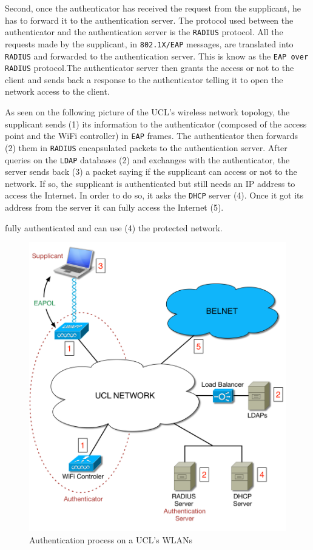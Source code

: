 Second, once the authenticator has received the request from the supplicant, he has to forward it to the authentication server. The protocol used between the authenticator and the authentication server is the \texttt{RADIUS} protocol. All the requests made by the supplicant, in \texttt{802.1X/EAP} messages, are translated into \texttt{RADIUS} and forwarded to the authentication server. This is know as the \texttt{EAP over RADIUS} protocol.The authenticator server then grants the access or not to the client and sends back a response to the authenticator telling it to open the network access to the client.

As seen on the following picture of the UCL's wireless network topology, the supplicant sends (1) its information to the authenticator (composed of the access point and the WiFi controller) in \texttt{EAP} frames. The authenticator then forwards (2) them in \texttt{RADIUS} encapsulated packets to the authentication server. After queries on the \texttt{LDAP} databases (2) and exchanges with the authenticator, the server sends back (3) a packet saying if the supplicant can access or not to the network. If so, the supplicant is authenticated but still needs an IP address to access the Internet. In order to do so, it asks the \texttt{DHCP} server (4). Once it got its address from the server it can fully access the Internet (5).

fully authenticated and can use (4) the protected network.

\begin{figure}[H]
	\center
	\includegraphics[width=.7\linewidth]{Pictures/chapter2/topology2.png}
	\caption{Authentication process on a UCL's WLANs}
\end{figure}


